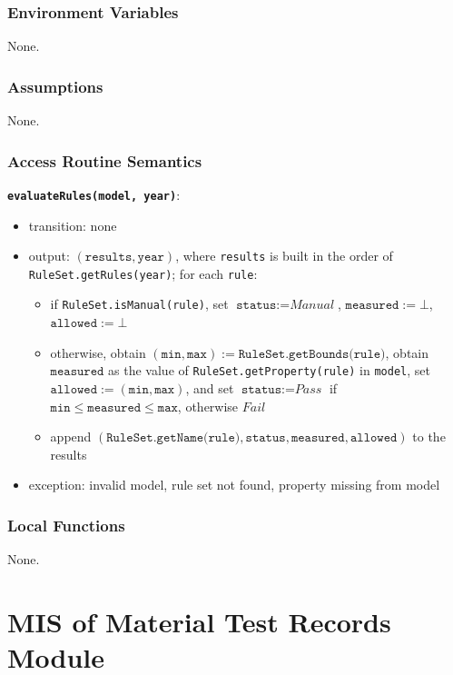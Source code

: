 \documentclass[12pt, titlepage]{article}
\begin{document}
\subsubsection{Environment Variables}
None.

\subsubsection{Assumptions}
None.

\subsubsection{Access Routine Semantics}

\textbf{\texttt{evaluateRules(model, year)}}:
\begin{itemize}
  \item transition: none
  \item output: $(\texttt{results}, \texttt{year})$, where \texttt{results} is built in the order of \texttt{RuleSet.getRules(year)}; for each \texttt{rule}:
  \begin{itemize}
    \item if \texttt{RuleSet.isManual(rule)}, set $\texttt{status} := \textit{Manual}$, $\texttt{measured} := \bot$, $\texttt{allowed} := \bot$
    \item otherwise, obtain $(\texttt{min}, \texttt{max}) := \texttt{RuleSet.getBounds(rule)}$, obtain $\texttt{measured}$ as the value of \texttt{RuleSet.getProperty(rule)} in \texttt{model}, set $\texttt{allowed} := (\texttt{min}, \texttt{max})$, and set $\texttt{status} := \textit{Pass}$ if $\texttt{min} \le \texttt{measured} \le \texttt{max}$, otherwise $\textit{Fail}$
    \item append $(\texttt{RuleSet.getName(rule)}, \texttt{status}, \texttt{measured}, \texttt{allowed})$ to the results
  \end{itemize}
  \item exception: invalid model, rule set not found, property missing from model
\end{itemize}

\subsubsection{Local Functions}
None.

\newpage

\section{MIS of Material Test Records Module} \label{mTestRecords}
\end{document}
